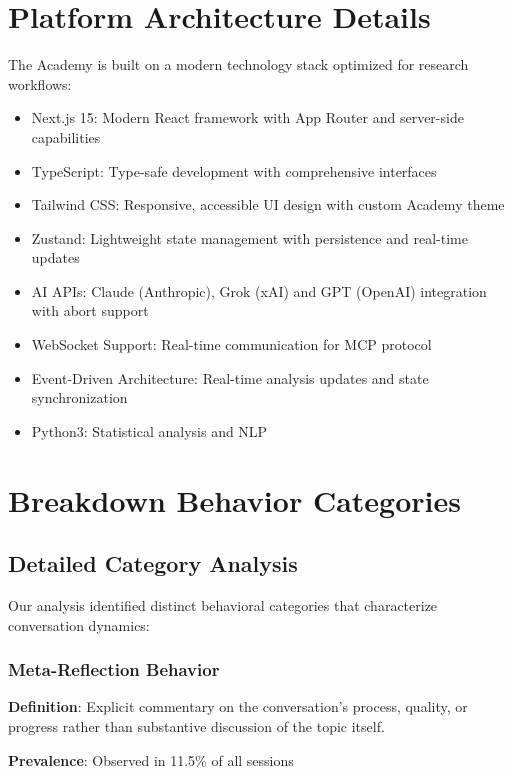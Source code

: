 \documentclass[11pt,letterpaper]{article}
\newcommand{\theacademy}{The Academy}
\newcommand{\exponedataMetaReflectionTriggers}{11.5\%}
\begin{document}
\section{Platform Architecture Details}
\label{app:architecture}

\theacademy{} is built on a modern technology stack optimized for research workflows:

\begin{itemize}
    \item Next.js 15: Modern React framework with App Router and server-side capabilities
    \item TypeScript: Type-safe development with comprehensive interfaces
    \item Tailwind CSS: Responsive, accessible UI design with custom Academy theme
    \item Zustand: Lightweight state management with persistence and real-time updates
    \item AI APIs: Claude (Anthropic), Grok (xAI) and GPT (OpenAI) integration with abort support
    \item WebSocket Support: Real-time communication for MCP protocol
    \item Event-Driven Architecture: Real-time analysis updates and state synchronization
    \item Python3: Statistical analysis and NLP
\end{itemize}

\section{Breakdown Behavior Categories}
\label{app:breakdown}

\subsection{Detailed Category Analysis}

Our analysis identified distinct behavioral categories that characterize conversation dynamics:

\subsubsection{Meta-Reflection Behavior}

\textbf{Definition}: Explicit commentary on the conversation's process, quality, or progress rather than substantive discussion of the topic itself.

\textbf{Prevalence}: Observed in \exponedataMetaReflectionTriggers{} of all sessions
\end{document}
